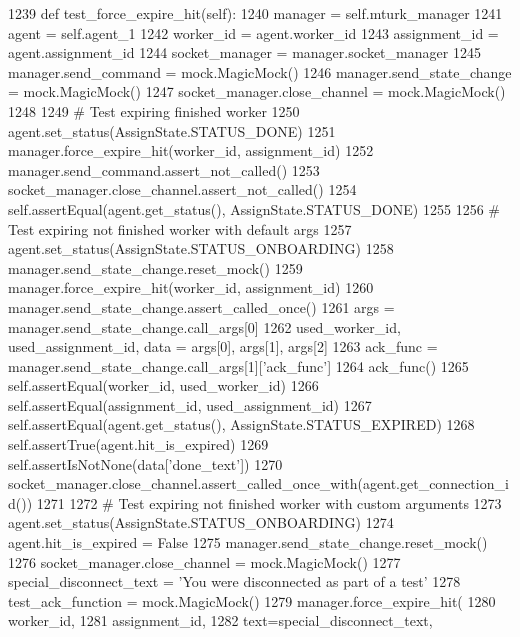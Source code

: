 \begin{DoxyCode}
1239     \textcolor{keyword}{def }test\_force\_expire\_hit(self):
1240         manager = self.mturk\_manager
1241         agent = self.agent\_1
1242         worker\_id = agent.worker\_id
1243         assignment\_id = agent.assignment\_id
1244         socket\_manager = manager.socket\_manager
1245         manager.send\_command = mock.MagicMock()
1246         manager.send\_state\_change = mock.MagicMock()
1247         socket\_manager.close\_channel = mock.MagicMock()
1248 
1249         \textcolor{comment}{# Test expiring finished worker}
1250         agent.set\_status(AssignState.STATUS\_DONE)
1251         manager.force\_expire\_hit(worker\_id, assignment\_id)
1252         manager.send\_command.assert\_not\_called()
1253         socket\_manager.close\_channel.assert\_not\_called()
1254         self.assertEqual(agent.get\_status(), AssignState.STATUS\_DONE)
1255 
1256         \textcolor{comment}{# Test expiring not finished worker with default args}
1257         agent.set\_status(AssignState.STATUS\_ONBOARDING)
1258         manager.send\_state\_change.reset\_mock()
1259         manager.force\_expire\_hit(worker\_id, assignment\_id)
1260         manager.send\_state\_change.assert\_called\_once()
1261         args = manager.send\_state\_change.call\_args[0]
1262         used\_worker\_id, used\_assignment\_id, data = args[0], args[1], args[2]
1263         ack\_func = manager.send\_state\_change.call\_args[1][\textcolor{stringliteral}{'ack\_func'}]
1264         ack\_func()
1265         self.assertEqual(worker\_id, used\_worker\_id)
1266         self.assertEqual(assignment\_id, used\_assignment\_id)
1267         self.assertEqual(agent.get\_status(), AssignState.STATUS\_EXPIRED)
1268         self.assertTrue(agent.hit\_is\_expired)
1269         self.assertIsNotNone(data[\textcolor{stringliteral}{'done\_text'}])
1270         socket\_manager.close\_channel.assert\_called\_once\_with(agent.get\_connection\_id())
1271 
1272         \textcolor{comment}{# Test expiring not finished worker with custom arguments}
1273         agent.set\_status(AssignState.STATUS\_ONBOARDING)
1274         agent.hit\_is\_expired = \textcolor{keyword}{False}
1275         manager.send\_state\_change.reset\_mock()
1276         socket\_manager.close\_channel = mock.MagicMock()
1277         special\_disconnect\_text = \textcolor{stringliteral}{'You were disconnected as part of a test'}
1278         test\_ack\_function = mock.MagicMock()
1279         manager.force\_expire\_hit(
1280             worker\_id,
1281             assignment\_id,
1282             text=special\_disconnect\_text,

\end{DoxyCode}
